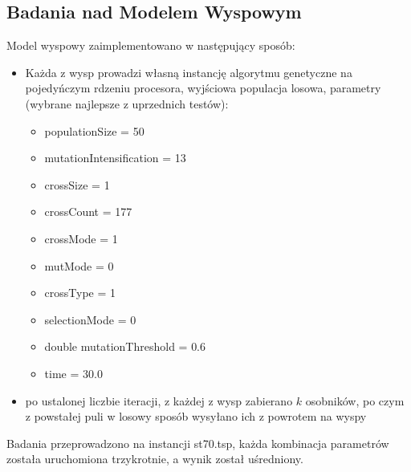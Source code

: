 \documentclass{article}
\begin{document}
\subsection{Badania nad Modelem Wyspowym}
Model wyspowy zaimplementowano w następujący sposób:
\begin{itemize}
	\item Każda z wysp prowadzi własną instancję algorytmu genetyczne na pojedyńczym rdzeniu procesora, wyjściowa populacja losowa, parametry (wybrane najlepsze z uprzednich testów):
	\begin{itemize}
		\item populationSize = 50
		\item mutationIntensification = 13
		\item crossSize = 1
		\item crossCount = 177
		\item crossMode = 1
		\item mutMode = 0
		\item crossType = 1
		\item selectionMode = 0
    	\item double mutationThreshold = 0.6
    	\item time = 30.0
	\end{itemize}
	\item po ustalonej liczbie iteracji, z każdej z wysp zabierano $k$ osobników, po czym z powstałej puli w losowy sposób wysyłano ich z powrotem na wyspy
\end{itemize}
Badania przeprowadzono na instancji st70.tsp, każda kombinacja parametrów została uruchomiona trzykrotnie, a wynik został uśredniony.
\end{document}
